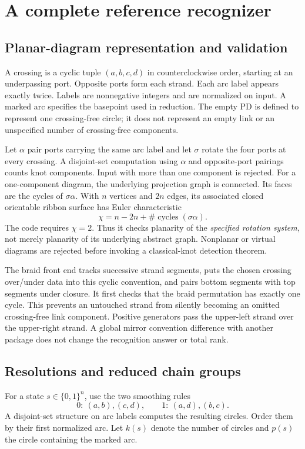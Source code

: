 \documentclass[11pt]{article}
\theoremstyle{definition}
\begin{document}
\section{A complete reference recognizer}
\subsection{Planar-diagram representation and validation}
A crossing is a cyclic tuple $(a,b,c,d)$ in counterclockwise order, starting
at an underpassing port. Opposite ports form each strand. Each arc label
appears exactly twice. Labels are nonnegative integers and are normalized on
input. A marked arc specifies the basepoint used in reduction. The empty PD
is defined to represent one crossing-free circle; it does not represent an
empty link or an unspecified number of crossing-free components.

Let $\alpha$ pair ports carrying the same arc label and let $\sigma$ rotate
the four ports at every crossing. A disjoint-set computation using $\alpha$
and opposite-port pairings counts knot components. Input with more than one
component is rejected. For a one-component diagram, the underlying projection
graph is connected. Its faces are the cycles of $\sigma\alpha$. With $n$
vertices and $2n$ edges, its associated closed orientable ribbon surface has
Euler characteristic
\[
 \chi=n-2n+\#\operatorname{cycles}(\sigma\alpha).
\]
The code requires $\chi=2$. Thus it checks planarity of the \emph{specified
rotation system}, not merely planarity of its underlying abstract graph.
Nonplanar or virtual diagrams are rejected before invoking a classical-knot
detection theorem.

The braid front end tracks successive strand segments, puts the chosen
crossing over/under data into this cyclic convention, and pairs bottom
segments with top segments under closure. It first checks that the braid
permutation has exactly one cycle. This prevents an untouched strand from
silently becoming an omitted crossing-free link component. Positive
generators pass the upper-left strand over the upper-right strand. A global
mirror convention difference with another package does not change the
recognition answer or total rank.

\subsection{Resolutions and reduced chain groups}
For a state $s\in\{0,1\}^n$, use the two smoothing rules
\[
 0:\ (a,b),(c,d),\qquad 1:\ (a,d),(b,c).
\]
A disjoint-set structure on arc labels computes the resulting circles. Order
them by their first normalized arc. Let $k(s)$ denote the number of circles
and $p(s)$ the circle containing the marked arc.
\end{document}
